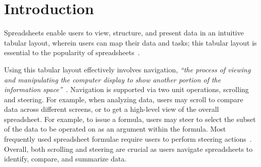 
\section{Introduction}
\label{sec:intro}
Spreadsheets enable users to view, structure, and present data
in an intuitive tabular layout, wherein users can map their data and tasks;
this tabular layout is essential to
the popularity of spreadsheets~\cite{nardi1990spreadsheet}.

Using this tabular layout effectively involves
navigation, \ie
{\em ``the process of viewing and manipulating the computer display to
show another portion of the information space''}~\cite{nav-study}.
Navigation is supported
via two unit operations, scrolling and steering.
For example, when analyzing data, users may scroll
to compare data across different screens, or to get
a high-level view of the overall spreadsheet.
 For example, to issue a formula,
users may steer to select
the subset of the data
to be operated on as an argument within the formula.
Most frequently used spreadsheet formulae
require users to perform steering actions~\cite{bradbard2014spreadsheet, lawson2009comparison}.
Overall, both scrolling and steering are crucial as
users navigate spreadsheets to
identify, compare, and summarize data.

